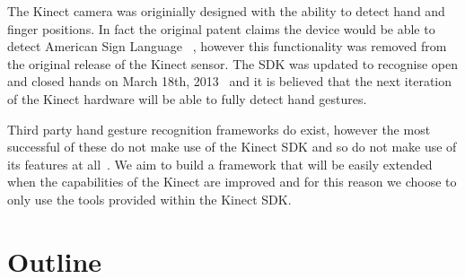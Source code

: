 The Kinect camera was originially designed with the ability to detect hand and finger positions. In fact the original patent claims the device would be able to detect American Sign Language ~\citep{LATTA:2010:biblatex}, however this functionality was removed from the original release of the Kinect sensor. The SDK was updated to recognise open and closed hands on March 18th, 2013~\citep{Microsoft:2013:Online} and it is believed that the next iteration of the Kinect hardware will be able to fully detect hand gestures.

Third party hand gesture recognition frameworks do exist, however the most successful of these do not make use of the Kinect SDK and so do not make use of its features at all~\citep{Forth:2013:Online}. We aim to build a framework that will be easily extended when the capabilities of the Kinect are improved and for this reason we choose to only use the tools provided within the Kinect SDK.
\section{Outline}



